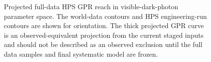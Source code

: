 \begin{figure}[t]
\centering
{}
\caption{Projected full-data HPS GPR reach in visible-dark-photon parameter space. The
world-data contours and HPS engineering-run contours are shown for orientation. The
thick projected GPR curve is an observed-equivalent projection from the current staged
inputs and should not be described as an observed exclusion until the full data samples
and final systematic model are frozen.}
\label{fig:projected-phase-space}
\end{figure}

\clearpage
